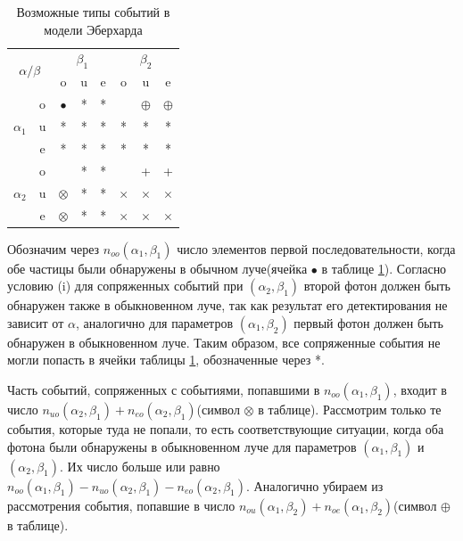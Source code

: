 \documentclass[%
master,         %
subf,           %
href,           %
,times         %
]{disser}
\numberwithin{equation}{section}
\numberwithin{figure}{section}
\begin{document}
\begin{table}
\centering
\begin{tabular}{|c|c|c|c|c|c|c|c|}
\hline 
\multicolumn{2}{|c|}{\multirow{2}{*}{$\alpha / \beta$}}  & \multicolumn{3}{c|}{$\beta_1$} & \multicolumn{3}{c|}{$\beta_2$} \\ 
\cline{3-8}
\multicolumn{2}{|c|}{}  & o & u & e & o & u & e \\ 
\hline 
\multirow{3}{*}{$\alpha_1$} & o & $\bullet$ & * & * &  & $\oplus$ & $\oplus$ \\ 
\cline{2-8}
 & u & * & * & * & * & * & * \\ 
\cline{2-8}
 & e & * & * & * & * & * & * \\ 
\hline 
\multirow{3}{*}{$\alpha_2$} & o &  & * & * &  & + & + \\ 
\cline{2-8}
 & u & $\otimes$ & * & * & $\times$ & $\times$ & $\times$ \\ 
\cline{2-8}
 & e & $\otimes$ & * & * & $\times$ & $\times$ & $\times$ \\ 
\hline 
\end{tabular} 
\caption{Возможные типы событий в модели Эберхарда}
\label{tab:Eberhard_table}
\end{table}

Обозначим через $n_{oo}(\alpha_1, \beta_1)$ число элементов первой последовательности, когда обе частицы были обнаружены в обычном луче(ячейка $\bullet$ в таблице \ref{tab:Eberhard_table}). Согласно условию (i) для сопряженных событий при $(\alpha_2, \beta_1)$ второй фотон должен быть обнаружен также в обыкновенном луче, так как результат его детектирования не зависит от $\alpha$, аналогично для параметров $(\alpha_1, \beta_2)$ первый фотон должен быть обнаружен в обыкновенном луче. Таким образом, все сопряженные события не могли попасть в ячейки таблицы \ref{tab:Eberhard_table}, обозначенные через *.

Часть событий, сопряженных с событиями, попавшими в $n_{oo}(\alpha_1, \beta_1)$, входит в число $n_{uo}(\alpha_2, \beta_1) + n_{eo}(\alpha_2, \beta_1)$(символ $\otimes$ в таблице). Рассмотрим только те события, которые туда не попали, то есть соответствующие ситуации, когда оба фотона были обнаружены в обыкновенном луче для параметров $(\alpha_1, \beta_1)$ и $(\alpha_2, \beta_1)$. Их число больше или равно $n_{oo}(\alpha_1, \beta_1) - n_{uo}(\alpha_2, \beta_1) - n_{eo}(\alpha_2, \beta_1)$. Аналогично убираем из рассмотрения события, попавшие в число $n_{ou}(\alpha_1, \beta_2) + n_{oe}(\alpha_1, \beta_2)$(символ $\oplus$ в таблице). 
\end{document}
